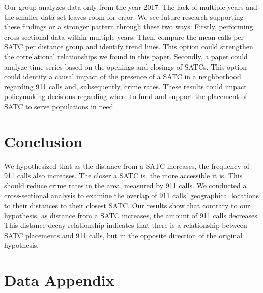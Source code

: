 \documentclass[12pt]{article}
\begin{document}
Our group analyzes data only from the year 2017. The lack of multiple years and the smaller data set leaves room for error. We see future research supporting these findings or a stronger pattern through these two ways: Firstly, performing cross-sectional data within multiple years. Then, compare the mean calls per SATC per distance group and identify trend lines. This option could strengthen the correlational relationships we found in this paper. Secondly, a paper could analyze time series based on the openings and closings of SATCs. This option could identify a causal impact of the presence of a SATC in a neighborhood regarding 911 calls and, subsequently, crime rates. These results could impact policymaking decisions regarding where to fund and support the placement of SATC to serve populations in need. 

\section{Conclusion}
\label{sec:conclusion}

We hypothesized that as the distance from a SATC increases, the frequency of 911 calls also increases. The closer a SATC is, the more accessible it is. This should reduce crime rates in the area, measured by 911 calls. We conducted a cross-sectional analysis to examine the overlap of 911 calls' geographical locations to their distances to their closest SATC. Our results show that contrary to our hypothesis, as distance from a SATC increases, the amount of 911 calls decreases. This distance decay relationship indicates that there is a relationship between SATC placements and 911 calls, but in the opposite direction of the original hypothesis. 



 

\newpage
\singlespacing
\setlength\bibsep{0pt}





\newpage
\section*{Data Appendix} \label{sec:appendixa}
\end{document}
